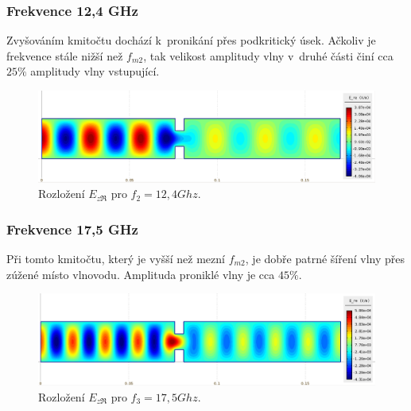 \newpage
\subsubsection*{Frekvence 12,4 GHz}
Zvyšováním kmitočtu dochází k~pronikání přes podkritický úsek. Ačkoliv je frekvence stále nižší než $f_{m2}$, tak velikost amplitudy vlny v~druhé části činí cca $25 \%$ amplitudy vlny vstupující.
\begin{figure}[!h]
	\centering
	\includegraphics[width=15cm]{priklad_R100narrow_Ere_12Ghz.png}
	\caption{Rozložení $E_{z\Re}$ pro $f_2 = 12,4\unit{Ghz}$.}
	\label{obr:priklad_R100narrow_Ere_12Ghz}
\end{figure}

\subsubsection*{Frekvence 17,5 GHz}
Při tomto kmitočtu, který je vyšší než mezní $f_{m2}$, je dobře patrné šíření vlny přes zúžené místo vlnovodu. Amplituda proniklé vlny je cca $45 \%$.
\begin{figure}[!h]
	\centering
	\includegraphics[width=15cm]{priklad_R100narrow_Ere_17Ghz.png}
	\caption{Rozložení $E_{z\Re}$ pro $f_3 = 17,5\unit{Ghz}$.}
	\label{obr:priklad_R100narrow_Ere_17Ghz}
\end{figure}

\newpage
